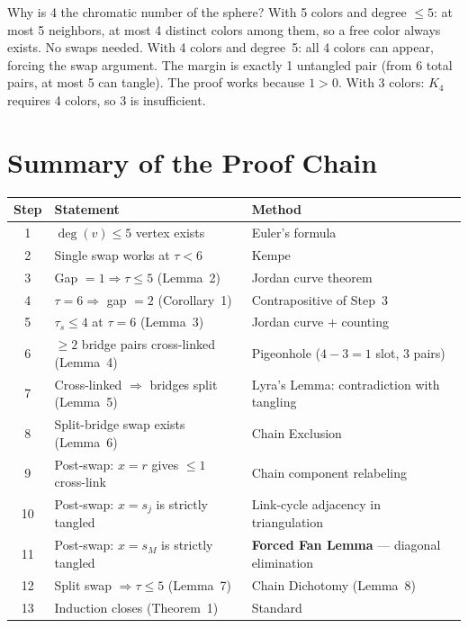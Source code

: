 \documentclass[11pt]{article}
\theoremstyle{remark}
\begin{document}
Why is 4 the chromatic number of the sphere? With 5 colors and degree $\leq 5$: at most 5 neighbors, at most 4 distinct colors among them, so a free color always exists. No swaps needed. With 4 colors and degree~5: all 4 colors can appear, forcing the swap argument. The margin is exactly 1 untangled pair (from 6 total pairs, at most 5 can tangle). The proof works because $1 > 0$. With 3 colors: $K_4$ requires 4 colors, so 3 is insufficient.

\section{Summary of the Proof Chain}

\begin{center}
\begin{tabular}{c l l}
\hline
\textbf{Step} & \textbf{Statement} & \textbf{Method} \\
\hline
1 & $\deg(v) \leq 5$ vertex exists & Euler's formula \\
2 & Single swap works at $\tau < 6$ & Kempe \cite{kempe1879} \\
3 & Gap $= 1 \Rightarrow \tau \leq 5$ (Lemma~2) & Jordan curve theorem \\
4 & $\tau = 6 \Rightarrow$ gap $= 2$ (Corollary~1) & Contrapositive of Step~3 \\
5 & $\tau_s \leq 4$ at $\tau = 6$ (Lemma~3) & Jordan curve + counting \\
6 & $\geq 2$ bridge pairs cross-linked (Lemma~4) & Pigeonhole ($4 - 3 = 1$ slot, 3 pairs) \\
7 & Cross-linked $\Rightarrow$ bridges split (Lemma~5) & Lyra's Lemma: contradiction with tangling \\
8 & Split-bridge swap exists (Lemma~6) & Chain Exclusion \\
9 & Post-swap: $x = r$ gives $\leq 1$ cross-link & Chain component relabeling \\
10 & Post-swap: $x = s_j$ is strictly tangled & Link-cycle adjacency in triangulation \\
11 & Post-swap: $x = s_M$ is strictly tangled & \textbf{Forced Fan Lemma} --- diagonal elimination \\
12 & Split swap $\Rightarrow \tau \leq 5$ (Lemma~7) & Chain Dichotomy (Lemma~8) \\
13 & Induction closes (Theorem~1) & Standard \\
\hline
\end{tabular}
\end{center}
\end{document}
